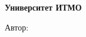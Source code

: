 \begin{titlepage}
	\clearpage\thispagestyle{empty}
	\centering
	
	\textbf{Университет ИТМО}
	\vspace{33ex}
	
	{\textbf{\FullCourseNameFirstPart}}
	
	\vspace{5ex}
	

	Автор: \href{\VKLink}{\textit{\AuthorInitials}}
	
	\vfill
	\CourseDate
	\pagebreak
\end{titlepage}
